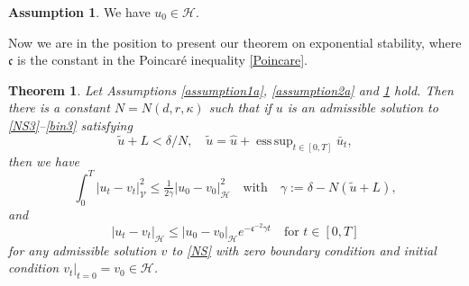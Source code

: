 \documentclass[11pt,reqno]{amsart}
\DeclareMathOperator*{\esssup}{ess\,sup}
\newtheorem{theorem}{Theorem}[section]
\theoremstyle{definition}
\newtheorem{assumption}{Assumption}[section]
\theoremstyle{remark}
\newcommand\frc{\mathfrak{c}}
\newcommand\cH{\mathcal{H}}
\newcommand\cV{\mathcal{V}}
\newcommand{\<}{\langle}
\renewcommand{\>}{\rangle}
\begin{document}
\begin{assumption}
                                         \label{assumption3a}
We have $u_0\in \cH$. 
\end{assumption}
 
 Now we are in the position to present 
 our theorem on exponential stability, 
 where $\frc$ is the constant in the Poincar\'e inequality \eqref{Poincare}.  
\begin{theorem}
          \label{theorem4}
Let Assumptions \ref{assumption1a}, \ref{assumption2a} 
and \ref{assumption3a} hold. Then there is a constant $N=N(d,r,\kappa)$ 
such that if $u$ is an admissible solution to \eqref{NS3}--\eqref{bin3} 
satisfying 
$$
\tilde u+L<\delta/N,\quad \tilde u=\hat u+\esssup_{t\in[0,T]} \bar u_t,  
$$
then we have 
$$
\int_0^T|u_t-v_t|^2_{\cV}\leq \tfrac{1}{2\gamma}|u_0-v_0|^2_{\cH}
\quad\text{with} \quad \gamma:=\delta-N(\tilde u+L), 
$$
and 
$$
|u_t-v_t|_{\cH}\leq |u_0-v_0|_{\cH}e^{-\frc^{-2}\gamma t}
\quad 
\text{for $t\in[0,T]$}
$$
for any admissible solution $v$ to \eqref{NS} with zero boundary condition 
and initial condition $v_t|_{t=0}=v_0\in\cH$. 
\end{theorem}
\end{document}
